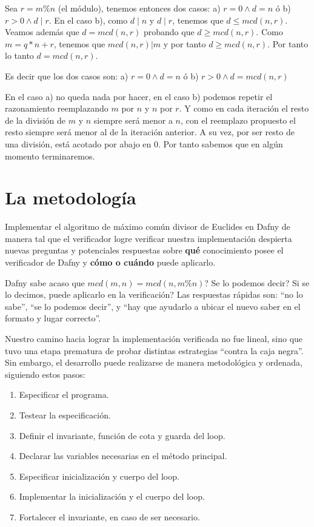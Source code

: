 \documentclass[12pt, a4paper, openany, fleqn]{book}
\begin{document}
    Sea $r = m \% n$ (el módulo), tenemos entonces dos casos: a) $r = 0 \land d = n$ ó b) $r > 0 \land d \mid r $. En el caso b), como $d \mid n$ y $d \mid r$, tenemos que $d \leq mcd(n, r)$. Veamos además que $d = mcd(n,r)$ probando que $d \geqslant mcd(n,r)$. Como $m = q * n + r$, tenemos que $mcd(n, r) | m$ y por tanto $d \geqslant mcd(n,r)$. Por tanto lo tanto $d = mcd(n,r)$.

    Es decir que los dos casos son: a) $r = 0 \land d = n$ ó b) $r > 0 \land d = mcd(n, r) $

    En el caso a) no queda nada por hacer, en el caso b) podemos repetir el razonamiento reemplazando $m$ por $n$ y $n$ por $r$. Y como en cada iteración el resto de la división de $m$ y $n$ siempre será menor a $n$, con el reemplazo propuesto el resto siempre será menor al de la iteración anterior. A su vez, por ser resto de una división, está acotado por abajo en $0$. Por tanto sabemos que en algún momento terminaremos.

    \section{La metodología}
    Implementar el algoritmo de máximo común divisor de Euclides en Dafny de manera tal que el verificador logre verificar nuestra implementación despierta nuevas preguntas y potenciales respuestas sobre \textbf{qué} conocimiento posee el verificador de Dafny y \textbf{cómo o cuándo} puede aplicarlo.

    Dafny sabe acaso que $mcd(m, n) = mcd(n, m\%n)$? Se lo podemos decir? Si se lo decimos, puede aplicarlo en la verificación?
    Las respuestas rápidas son: ``no lo sabe'', ``se lo podemos decir'', y ``hay que ayudarlo a ubicar el nuevo saber en el formato y lugar correcto''.

    Nuestro camino hacia lograr la implementación verificada no fue lineal, sino que tuvo una etapa prematura de probar distintas estrategias ``contra la caja negra''. Sin embargo, el desarrollo puede realizarse de manera metodológica y ordenada, siguiendo estos pasos:
    \begin{enumerate}
        \item Especificar el programa.
        \item Testear la especificación.
        \item Definir el invariante, función de cota y guarda del loop.
        \item Declarar las variables necesarias en el método principal.
        \item Especificar inicialización y cuerpo del loop.
        \item Implementar la inicialización y el cuerpo del loop.
        \item Fortalecer el invariante, en caso de ser necesario.
    \end{enumerate}
\end{document}
